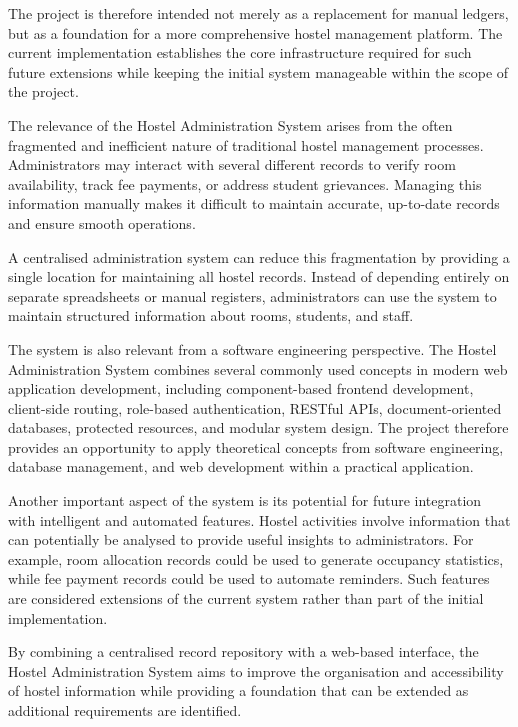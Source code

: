 The project is therefore intended not merely as a replacement for manual ledgers, but as a foundation for a more comprehensive hostel management platform. The current implementation establishes the core infrastructure required for such future extensions while keeping the initial system manageable within the scope of the project.


The relevance of the Hostel Administration System arises from the often fragmented and inefficient nature of traditional hostel management processes. Administrators may interact with several different records to verify room availability, track fee payments, or address student grievances. Managing this information manually makes it difficult to maintain accurate, up-to-date records and ensure smooth operations.

A centralised administration system can reduce this fragmentation by providing a single location for maintaining all hostel records. Instead of depending entirely on separate spreadsheets or manual registers, administrators can use the system to maintain structured information about rooms, students, and staff.

The system is also relevant from a software engineering perspective. The Hostel Administration System combines several commonly used concepts in modern web application development, including component-based frontend development, client-side routing, role-based authentication, RESTful APIs, document-oriented databases, protected resources, and modular system design. The project therefore provides an opportunity to apply theoretical concepts from software engineering, database management, and web development within a practical application.

Another important aspect of the system is its potential for future integration with intelligent and automated features. Hostel activities involve information that can potentially be analysed to provide useful insights to administrators. For example, room allocation records could be used to generate occupancy statistics, while fee payment records could be used to automate reminders. Such features are considered extensions of the current system rather than part of the initial implementation.

By combining a centralised record repository with a web-based interface, the Hostel Administration System aims to improve the organisation and accessibility of hostel information while providing a foundation that can be extended as additional requirements are identified.

